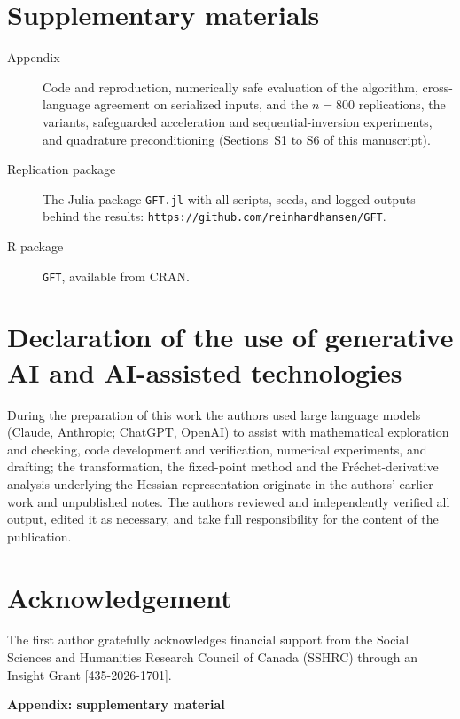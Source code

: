 \documentclass[11pt]{article}
\begin{document}
\section*{Supplementary materials}
\begin{description}
\item[Appendix] Code and reproduction, numerically safe evaluation of
the algorithm, cross-language agreement on serialized inputs, and the
$n=800$ replications, the variants, safeguarded acceleration and
sequential-inversion experiments, and quadrature preconditioning
(Sections~S1 to S6 of this manuscript).
\item[Replication package] The Julia package \texttt{GFT.jl} with
all scripts, seeds, and logged outputs behind the results:
\texttt{https://github.com/reinhardhansen/GFT}.
\item[R package] \texttt{GFT}, available from CRAN.
\end{description}

\section*{Declaration of the use of generative AI and AI-assisted
technologies}
During the preparation of this work the authors used large language
models (Claude, Anthropic; ChatGPT, OpenAI) to assist with
mathematical exploration and checking, code development and
verification, numerical experiments, and drafting; the
transformation, the fixed-point method and the Fr\'echet-derivative
analysis underlying the Hessian representation originate in the
authors' earlier work and unpublished notes. The authors reviewed and
independently verified all output, edited it as necessary, and take
full responsibility for the content of the publication.

\section*{Acknowledgement}
The first author gratefully acknowledges financial support from the
Social Sciences and Humanities Research Council of Canada (SSHRC)
through an Insight Grant [435-2026-1701].

\appendix
\setcounter{section}{0}
\setcounter{table}{0}
\renewcommand{\thesection}{S\arabic{section}}
\renewcommand{\thetable}{S\arabic{table}}

\begin{center}
{\large\bf Appendix: supplementary material}
\end{center}
\end{document}
